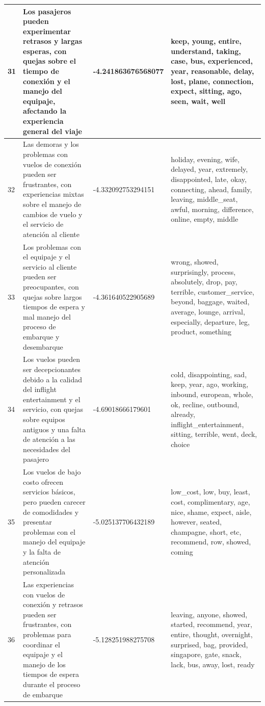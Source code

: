 \documentclass{report}
\begin{document}
\begin{longtable}{|p{1cm}|p{4cm}|p{4cm}|p{6cm}|}
                    \hline
                    31 & Los pasajeros pueden experimentar retrasos y largas esperas, con quejas sobre el tiempo de conexión y el manejo del equipaje, afectando la experiencia general del viaje & -4.241863676568077 & keep, young, entire, understand, taking, case, bus, experienced, year, reasonable, delay, lost, plane, connection, expect, sitting, ago, seen, wait, well \\
                    \hline
                    32 & Las demoras y los problemas con vuelos de conexión pueden ser frustrantes, con experiencias mixtas sobre el manejo de cambios de vuelo y el servicio de atención al cliente & -4.332092753294151 & holiday, evening, wife, delayed, year, extremely, disappointed, late, okay, connecting, ahead, family, leaving, middle\_seat, awful, morning, difference, online, empty, middle \\
                    \hline
                    33 & Los problemas con el equipaje y el servicio al cliente pueden ser preocupantes, con quejas sobre largos tiempos de espera y mal manejo del proceso de embarque y desembarque & -4.361640522905689 & wrong, showed, surprisingly, process, absolutely, drop, pay, terrible, customer\_service, beyond, baggage, waited, average, lounge, arrival, especially, departure, leg, product, something \\
                    \hline
                    34 & Los vuelos pueden ser decepcionantes debido a la calidad del inflight entertainment y el servicio, con quejas sobre equipos antiguos y una falta de atención a las necesidades del pasajero & -4.69018666179601 & cold, disappointing, sad, keep, year, ago, working, inbound, european, whole, ok, recline, outbound, already, inflight\_entertainment, sitting, terrible, went, deck, choice \\
                    \hline
                    35 & Los vuelos de bajo costo ofrecen servicios básicos, pero pueden carecer de comodidades y presentar problemas con el manejo del equipaje y la falta de atención personalizada & -5.025137706432189 & low\_cost, low, buy, least, cost, complimentary, age, nice, shame, expect, aisle, however, seated, champagne, short, etc, recommend, row, showed, coming \\
                    \hline
                    36 & Las experiencias con vuelos de conexión y retrasos pueden ser frustrantes, con problemas para coordinar el equipaje y el manejo de los tiempos de espera durante el proceso de embarque & -5.128251988275708 & leaving, anyone, showed, started, recommend, year, entire, thought, overnight, surprised, bag, provided, singapore, gate, snack, lack, bus, away, lost, ready \\

\end{longtable}
\end{document}
